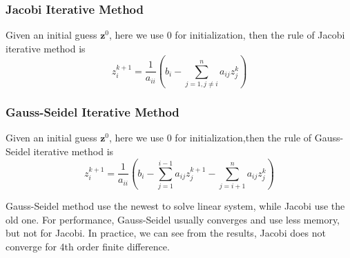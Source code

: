 \documentclass[a4paper]{article}
\begin{document}
\subsubsection{Jacobi Iterative Method}
Given an initial guess $\mathbf{z}^0 $, here we use $0$ for initialization, then the rule of Jacobi iterative method is 
\begin{equation}
    z_i^{k+1} = \frac{1}{a_{ii}}(b_i-\sum_{j=1,j\neq i}^n a_{ij}z_j^k)
\end{equation}

\subsubsection{Gauss-Seidel Iterative Method}
Given an initial guess $\mathbf{z}^0$, here we use $0$ for initialization,then the rule of Gauss-Seidel iterative method is 
\begin{equation}
    z_i^{k+1} = \frac{1}{a_{ii}}(b_i-\sum_{j=1}^{i-1} a_{ij}z_j^{k+1}-\sum_{j=i+1}^{n} a_{ij}z_j^{k})
\end{equation}

Gauss-Seidel method use the newest to solve linear system, while Jacobi use the old one. For performance, Gauss-Seidel usually converges and use less memory, but not for Jacobi. In practice, we can see from the results, Jacobi does not converge for 4th order finite difference.\\
\end{document}
